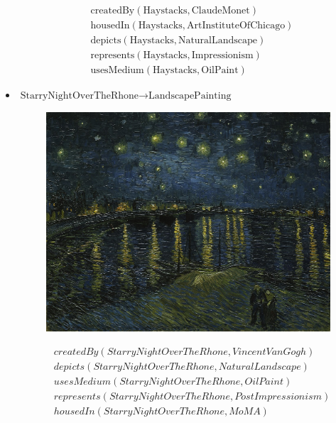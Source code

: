 \documentclass[a4paper, 11pt]{article}
\begin{document}
\begin{itemize}
\begin{figure}[H]
    \end{figure}
    \begin{align*}
      &\text{createdBy}(\text{Haystacks}, \text{ClaudeMonet})\\
      &\text{housedIn}(\text{Haystacks}, \text{ArtInstituteOfChicago})\\
      &\text{depicts}(\text{Haystacks}, \text{NaturalLandscape})\\
      &\text{represents}(\text{Haystacks}, \text{Impressionism})\\
      &\text{usesMedium}(\text{Haystacks}, \text{OilPaint})
    \end{align*}
  \item $\text{StarryNightOverTheRhone} \to \text{LandscapePainting}$
    \begin{figure}[H]
      \centering
      \includegraphics[width=\linewidth]{images/starrynightovertherhone.jpg}
    \end{figure}
    \begin{align*}
      &createdBy(StarryNightOverTheRhone, VincentVanGogh)\\
      &depicts(StarryNightOverTheRhone, NaturalLandscape)\\
      &usesMedium(StarryNightOverTheRhone, OilPaint)\\
      &represents(StarryNightOverTheRhone, PostImpressionism)\\
      &housedIn(StarryNightOverTheRhone, MoMA)
    \end{align*}
\end{itemize}
\end{document}
